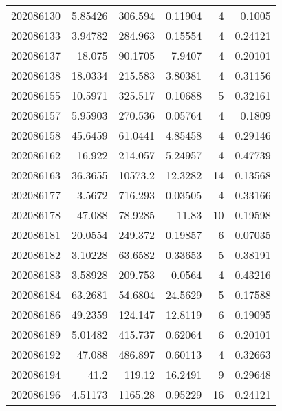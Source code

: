 \begin{tabular}{rrrrrr}
 202086130 &          5.85426 &      306.594  &            0.11904 &           4 & 0.1005  \\
 202086133 &          3.94782 &      284.963  &            0.15554 &           4 & 0.24121 \\
 202086137 &         18.075   &       90.1705 &            7.9407  &           4 & 0.20101 \\
 202086138 &         18.0334  &      215.583  &            3.80381 &           4 & 0.31156 \\
 202086155 &         10.5971  &      325.517  &            0.10688 &           5 & 0.32161 \\
 202086157 &          5.95903 &      270.536  &            0.05764 &           4 & 0.1809  \\
 202086158 &         45.6459  &       61.0441 &            4.85458 &           4 & 0.29146 \\
 202086162 &         16.922   &      214.057  &            5.24957 &           4 & 0.47739 \\
 202086163 &         36.3655  &    10573.2    &           12.3282  &          14 & 0.13568 \\
 202086177 &          3.5672  &      716.293  &            0.03505 &           4 & 0.33166 \\
 202086178 &         47.088   &       78.9285 &           11.83    &          10 & 0.19598 \\
 202086181 &         20.0554  &      249.372  &            0.19857 &           6 & 0.07035 \\
 202086182 &          3.10228 &       63.6582 &            0.33653 &           5 & 0.38191 \\
 202086183 &          3.58928 &      209.753  &            0.0564  &           4 & 0.43216 \\
 202086184 &         63.2681  &       54.6804 &           24.5629  &           5 & 0.17588 \\
 202086186 &         49.2359  &      124.147  &           12.8119  &           6 & 0.19095 \\
 202086189 &          5.01482 &      415.737  &            0.62064 &           6 & 0.20101 \\
 202086192 &         47.088   &      486.897  &            0.60113 &           4 & 0.32663 \\
 202086194 &         41.2     &      119.12   &           16.2491  &           9 & 0.29648 \\
 202086196 &          4.51173 &     1165.28   &            0.95229 &          16 & 0.24121 \\

\end{tabular}
